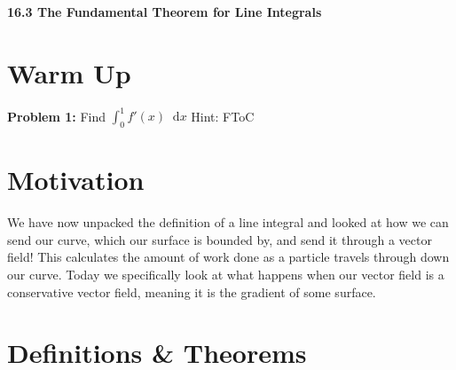 \documentclass[11pt]{article}
\newcommand{\vs}{\vspace*{.1in}}
\newcommand*\dif{\mathop{}\!\mathrm{d}}
\begin{document}
\begin{LARGE}\begin{center}\bf 16.3 The Fundamental Theorem for Line Integrals\end{center}
\end{LARGE}

\vs\vs



\section{Warm Up}
\textbf{Problem 1:} Find $\int_0^1 f'(x) \dif{x}$ Hint: FToC


\section{Motivation}
We have now unpacked the definition of a line integral and looked at how we can send our curve, which our surface is bounded by, and send it through a vector field! This calculates the amount of work done as a particle travels through down our curve. Today we specifically look at what happens when our vector field is a conservative vector field, meaning it is the gradient of some surface.



\section{Definitions \& Theorems}
\end{document}
